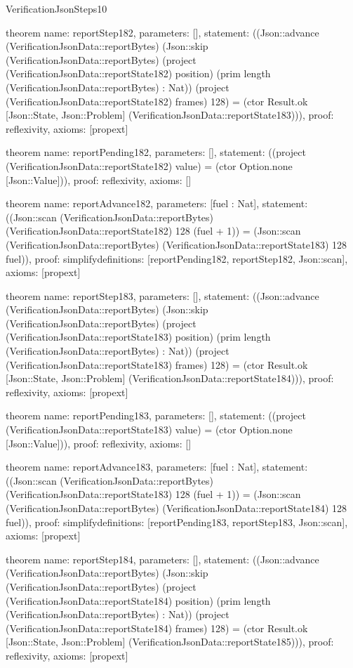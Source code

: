 \begin{lexlean}{VerificationJsonSteps10}
\begin{semanticmodule}
theorem{
  name: reportStep182,
  parameters: [],
  statement: ((Json::advance (VerificationJsonData::reportBytes) (Json::skip (VerificationJsonData::reportBytes) (project (VerificationJsonData::reportState182) position) (prim length (VerificationJsonData::reportBytes) : Nat)) (project (VerificationJsonData::reportState182) frames) 128) = (ctor Result.ok [Json::State, Json::Problem] (VerificationJsonData::reportState183))),
  proof: reflexivity{},
  axioms: [propext]
}

theorem{
  name: reportPending182,
  parameters: [],
  statement: ((project (VerificationJsonData::reportState182) value) = (ctor Option.none [Json::Value])),
  proof: reflexivity{},
  axioms: []
}

theorem{
  name: reportAdvance182,
  parameters: [fuel : Nat],
  statement: ((Json::scan (VerificationJsonData::reportBytes) (VerificationJsonData::reportState182) 128 (fuel + 1)) = (Json::scan (VerificationJsonData::reportBytes) (VerificationJsonData::reportState183) 128 fuel)),
  proof: simplify{definitions: [reportPending182, reportStep182, Json::scan]},
  axioms: [propext]
}

theorem{
  name: reportStep183,
  parameters: [],
  statement: ((Json::advance (VerificationJsonData::reportBytes) (Json::skip (VerificationJsonData::reportBytes) (project (VerificationJsonData::reportState183) position) (prim length (VerificationJsonData::reportBytes) : Nat)) (project (VerificationJsonData::reportState183) frames) 128) = (ctor Result.ok [Json::State, Json::Problem] (VerificationJsonData::reportState184))),
  proof: reflexivity{},
  axioms: [propext]
}

theorem{
  name: reportPending183,
  parameters: [],
  statement: ((project (VerificationJsonData::reportState183) value) = (ctor Option.none [Json::Value])),
  proof: reflexivity{},
  axioms: []
}

theorem{
  name: reportAdvance183,
  parameters: [fuel : Nat],
  statement: ((Json::scan (VerificationJsonData::reportBytes) (VerificationJsonData::reportState183) 128 (fuel + 1)) = (Json::scan (VerificationJsonData::reportBytes) (VerificationJsonData::reportState184) 128 fuel)),
  proof: simplify{definitions: [reportPending183, reportStep183, Json::scan]},
  axioms: [propext]
}

theorem{
  name: reportStep184,
  parameters: [],
  statement: ((Json::advance (VerificationJsonData::reportBytes) (Json::skip (VerificationJsonData::reportBytes) (project (VerificationJsonData::reportState184) position) (prim length (VerificationJsonData::reportBytes) : Nat)) (project (VerificationJsonData::reportState184) frames) 128) = (ctor Result.ok [Json::State, Json::Problem] (VerificationJsonData::reportState185))),
  proof: reflexivity{},
  axioms: [propext]
}


\end{semanticmodule}
\end{lexlean}
